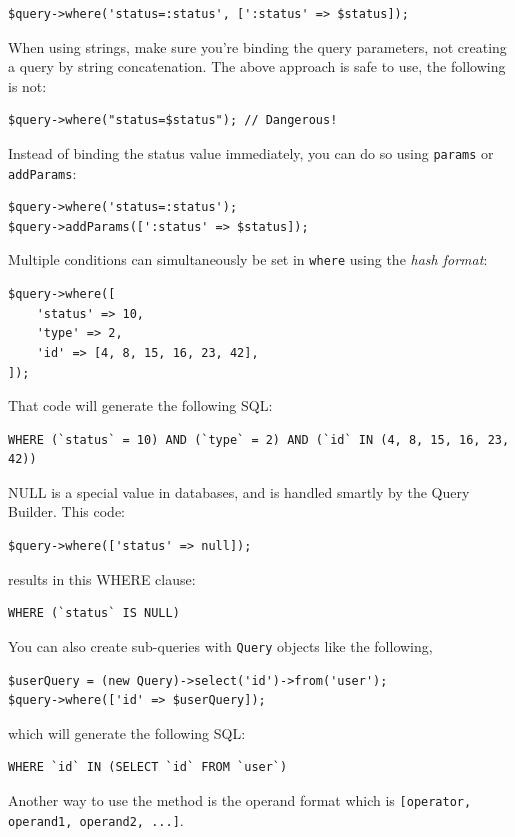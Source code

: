 \lstset{language=php}\begin{lstlisting}
$query->where('status=:status', [':status' => $status]);
\end{lstlisting}
When using strings, make sure you're binding the query parameters, not creating a query by string concatenation. The above approach is safe to use, the following is not:

\lstset{language=php}\begin{lstlisting}
$query->where("status=$status"); // Dangerous!
\end{lstlisting}
Instead of binding the status value immediately, you can do so using \lstinline|params| or \lstinline|addParams|:

\lstset{language=php}\begin{lstlisting}
$query->where('status=:status');
$query->addParams([':status' => $status]);
\end{lstlisting}
Multiple conditions can simultaneously be set in \lstinline|where| using the \textit{hash format}:

\lstset{language=php}\begin{lstlisting}
$query->where([
    'status' => 10,
    'type' => 2,
    'id' => [4, 8, 15, 16, 23, 42],
]);
\end{lstlisting}
That code will generate the following SQL:

\lstset{language=sql}\begin{lstlisting}
WHERE (`status` = 10) AND (`type` = 2) AND (`id` IN (4, 8, 15, 16, 23, 42))
\end{lstlisting}
NULL is a special value in databases, and is handled smartly by the Query Builder. This code:

\lstset{language=php}\begin{lstlisting}
$query->where(['status' => null]);
\end{lstlisting}
results in this WHERE clause:

\lstset{language=sql}\begin{lstlisting}
WHERE (`status` IS NULL)
\end{lstlisting}
You can also create sub-queries with \lstinline|Query| objects like the following,

\lstset{language=php}\begin{lstlisting}
$userQuery = (new Query)->select('id')->from('user');
$query->where(['id' => $userQuery]);
\end{lstlisting}
which will generate the following SQL:

\lstset{language=sql}\begin{lstlisting}
WHERE `id` IN (SELECT `id` FROM `user`)
\end{lstlisting}
Another way to use the method is the operand format which is \lstinline|[operator, operand1, operand2, ...]|.

